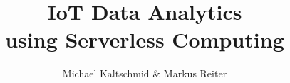 \makeatletter
{}
\makeatother

\usepackage{graphicx}
\usepackage{graphbox}
\graphicspath{ {../assets/} }

\usepackage{hyperref}
\usepackage{cleveref}
\usepackage{nameref}

\usepackage[
  binary-units = true,
  per-mode     = symbol,
]{siunitx}

\newcommand{\whitelist}[1]{#1}

\title{IoT Data Analytics \\ using Serverless Computing}
\author{Michael Kaltschmid \& Markus Reiter}
\date{}
